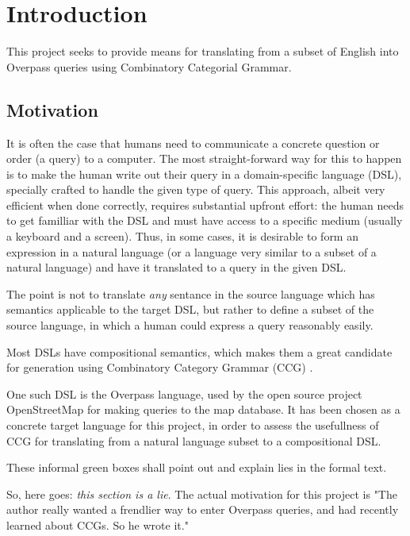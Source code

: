 \documentclass[main.tex]{subfiles}
\begin{document}
\section{Introduction}
This project seeks to provide means for translating from a subset of English
into Overpass queries using Combinatory Categorial Grammar.

\subsection{Motivation}
It is often the case that humans need to communicate a concrete question
or order (a query) to a computer. The most straight-forward way for this to happen is
to make the human write out their query in a domain-specific language (DSL),
specially crafted to handle the given type of query. This approach, albeit
very efficient when done correctly, requires substantial upfront effort:
the human needs to get familliar with the DSL and must have access to a specific
medium (usually a keyboard and a screen). Thus, in some cases, it is desirable
to form an expression in a natural language (or a language very similar to a
subset of a natural language) and have it translated to a query in the given
DSL.

The point is not to translate \emph{any} sentance in the source language
which has semantics applicable to the target DSL, but rather to define a
subset of the source language, in which a human could express a query
reasonably easily.

Most DSLs have compositional semantics, which makes them a great candidate
for generation using Combinatory Category Grammar (CCG) \cite[p.~181]{nts}.

One such DSL is the Overpass language, used by the open source project
OpenStreetMap for making queries to the map database. It has been chosen as
a concrete target language for this project, in order to assess the usefullness
of CCG for translating from a natural language subset to a compositional
DSL.

\begin{greenbox}
    These informal green boxes shall point out and explain lies in the formal text.

    \vspace{2mm}
    So, here goes: \emph{this section is a lie}. The actual motivation for this project
    is "The author really wanted a frendlier way to enter Overpass queries,
    and had recently learned about CCGs. So he wrote it."
\end{greenbox}
\end{document}
